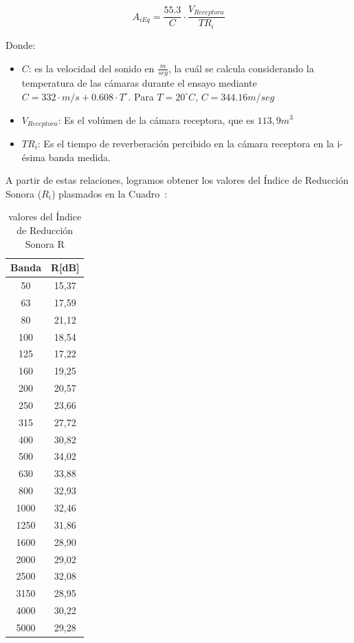 \begin{equation}
    A_{i Eq} =  \frac{55.3}{C} \cdot \frac{V_{Receptora}}{TR_i}
    \label{eq:aerea_equivalente}
\end{equation}

\par Donde:
\begin{itemize}
    \item $C$: es la velocidad del sonido en $\frac{m}{seg}$, la cuál se calcula considerando la temperatura de las cámaras durante el ensayo mediante $C = 332\cdot m/s+ 0.608 \cdot T^{\circ}$. Para $T= 20^{\circ}C$, $C = 344.16 m/seg$
    \item $V_{Receptora}$: Es el volúmen de la cámara receptora, que es $113,9m^3$
    \item $TR_i$: Es el tiempo de reverberación percibido en la cámara receptora en la i-ésima banda medida.
\end{itemize}

\par A partir de estas relaciones, logramos obtener los valores del Índice de Reducción Sonora ($R_i$) plasmados en la Cuadro~:

\begin{table}[H]
\setlength\arrayrulewidth{1pt}
    \centering
    \begin{tabular}{|c|c|} \hline
        \textbf{Banda} & \textbf{R[dB]} \\\hline
        50 & 15,37\\\hline
        63 & 17,59\\\hline
        80 & 21,12 \\\hline
        100 & 18,54\\\hline
        125 & 17,22\\\hline
        160 & 19,25\\\hline
        200 & 20,57\\\hline
        250 & 23,66\\\hline
        315 & 27,72\\\hline
        400 & 30,82\\\hline
        500 & 34,02\\\hline
        630 & 33,88\\\hline
        800 & 32,93\\\hline
        1000& 32,46\\\hline
        1250& 31,86\\\hline
        1600& 28,90\\\hline
        2000& 29,02\\\hline
        2500& 32,08\\\hline
        3150& 28,95\\\hline
        4000& 30,22\\\hline
        5000& 29,28\\\hline
    \end{tabular}
    \caption{valores del Índice de Reducción Sonora R}
    \label{tab:reduccion_sonora_R}
\end{table}

